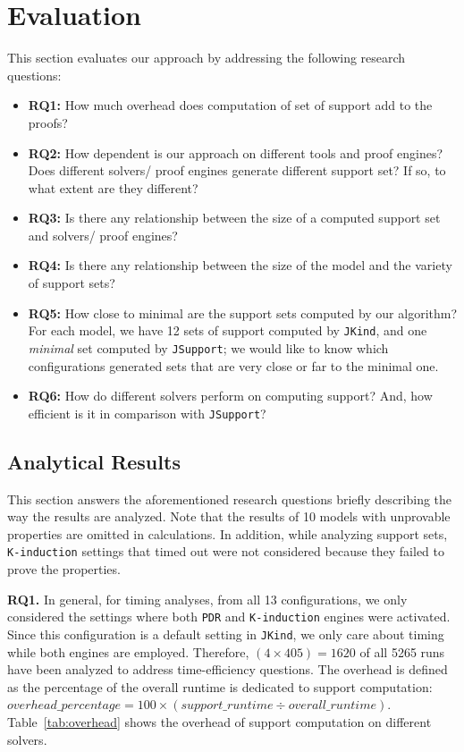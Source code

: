 \section{Evaluation}
\label{sec:eval}
This section evaluates our approach by addressing the following research questions:

\begin{itemize}
    \item \textbf{RQ1:} How much overhead does computation of set of support add to the proofs? 
    \item \textbf{RQ2:} How dependent is our approach on different tools and proof engines? Does different solvers/ proof engines generate different support set? If so, to what extent are they different?
    \item \textbf{RQ3:} Is there any relationship between the size of a computed support set and 
    solvers/ proof engines? 
    \item \textbf{RQ4:} Is there any relationship between the size of the model and the variety of support sets?
    \item \textbf{RQ5:} How close to minimal are the support sets computed by our algorithm? For each model, we have 12 sets of support computed by \texttt{JKind}, and one \emph{minimal} set computed by \texttt{JSupport}; we would like to know which configurations generated sets that are very close or far to the minimal one.
    \item \textbf{RQ6:} How do different solvers perform on computing support? And, how efficient is it in comparison with \texttt{JSupport}?
\end{itemize} 

\subsection{Analytical Results}
\label{sec:res}
This section answers the aforementioned research questions briefly describing the way the results are analyzed. Note that the results of 10 models with unprovable properties are omitted in calculations. In addition, while analyzing support sets, \texttt{K-induction} settings that timed out were not considered because they failed to prove the properties.

\textbf{RQ1.} In general, for timing analyses, from all 13 configurations, we only considered the settings where both \texttt{PDR} and \texttt{K-induction} engines were activated. Since this configuration is a default setting in \texttt{JKind}, we only care about timing while both engines are employed. Therefore, $(4 \times 405) = 1620$ of all 5265 runs have been analyzed to address time-efficiency questions. The overhead is defined as the percentage of the overall runtime is dedicated to support computation:
\mbox{$overhead\_percentage = 100 \times (support\_runtime \div overall\_runtime)$}.
 Table~\ref{tab:overhead} shows the overhead of support computation on different solvers.

